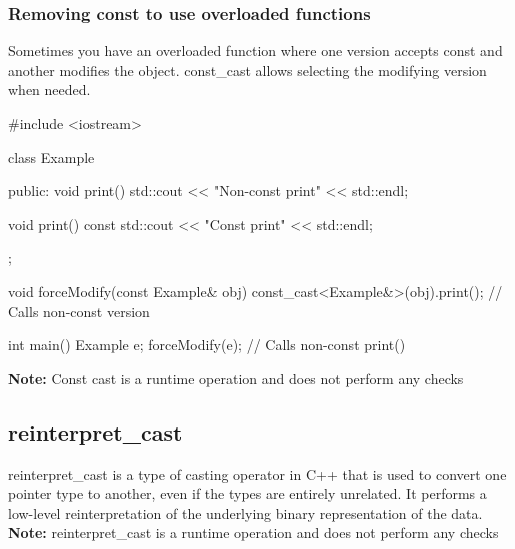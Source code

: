 \documentclass{report}
\begin{document}
    \subsubsection{Removing const to use overloaded functions}
    \bigbreak \noindent 
    Sometimes you have an overloaded function where one version accepts const and another modifies the object. const\_cast allows selecting the modifying version when needed.
    \bigbreak \noindent 
    \begin{cppcode}
        #include <iostream>

        class Example {
            public:
            void print() {
                std::cout << "Non-const print" << std::endl;
            }

            void print() const {
                std::cout << "Const print" << std::endl;
            }
        };

        void forceModify(const Example& obj) {
            const_cast<Example&>(obj).print();  // Calls non-const version
        }

        int main() {
            Example e;
            forceModify(e);  // Calls non-const print()
        }
    \end{cppcode}
    \bigbreak \noindent 
    \textbf{Note:} Const cast is a runtime operation and does not perform any checks

    \bigbreak \noindent 
    \subsection{reinterpret\_cast}
    \bigbreak \noindent 
    reinterpret\_cast is a type of casting operator in C++ that is used to convert one pointer type to another, even if the types are entirely unrelated. It performs a low-level reinterpretation of the underlying binary representation of the data.
    \bigbreak \noindent 
    \textbf{Note:} reinterpret\_cast is a runtime operation and does not perform any checks

    \bigbreak \noindent 
\end{document}
